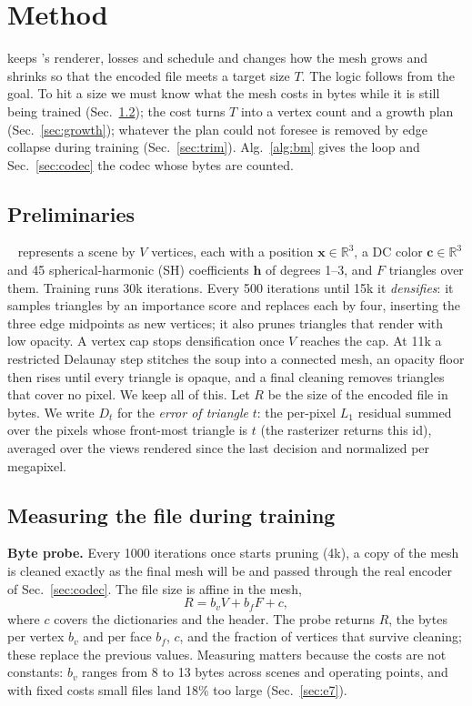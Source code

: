 \section{Method}
\label{sec:method}

\BM keeps \MS's renderer, losses and schedule and changes how the mesh grows and shrinks so that the encoded file meets a target size $T$. The logic follows from the goal. To hit a size we must know what the mesh costs in bytes while it is still being trained (Sec.~\ref{sec:probe}); the cost turns $T$ into a vertex count and a growth plan (Sec.~\ref{sec:growth}); whatever the plan could not foresee is removed by edge collapse during training (Sec.~\ref{sec:trim}). Alg.~\ref{alg:bm} gives the loop and Sec.~\ref{sec:codec} the codec whose bytes are counted.

\subsection{Preliminaries}
\label{sec:prelim}
\MS~\cite{meshsplatting2025} represents a scene by $V$ vertices, each with a position $\mathbf{x}\in\mathbb{R}^3$, a DC color $\mathbf{c}\in\mathbb{R}^3$ and 45 spherical-harmonic (SH) coefficients $\mathbf{h}$ of degrees 1--3, and $F$ triangles over them. Training runs 30k iterations. Every 500 iterations until 15k it \emph{densifies}: it samples triangles by an importance score and replaces each by four, inserting the three edge midpoints as new vertices; it also prunes triangles that render with low opacity. A vertex cap stops densification once $V$ reaches the cap. At 11k a restricted Delaunay step stitches the soup into a connected mesh, an opacity floor then rises until every triangle is opaque, and a final cleaning removes triangles that cover no pixel. We keep all of this. Let $R$ be the size of the encoded file in bytes. We write $D_t$ for the \emph{error of triangle} $t$: the per-pixel $L_1$ residual summed over the pixels whose front-most triangle is $t$ (the rasterizer returns this id), averaged over the views rendered since the last decision and normalized per megapixel.

\subsection{Measuring the file during training}
\label{sec:probe}
\noindent\textbf{Byte probe.} Every 1000 iterations once \MS starts pruning (4k), a copy of the mesh is cleaned exactly as the final mesh will be and passed through the real encoder of Sec.~\ref{sec:codec}. The file size is affine in the mesh,
\begin{equation}
R = b_v V + b_f F + c ,
\label{eq:bytes}
\end{equation}
where $c$ covers the dictionaries and the header. The probe returns $R$, the bytes per vertex $b_v$ and per face $b_f$, $c$, and the fraction of vertices that survive cleaning; these replace the previous values. Measuring matters because the costs are not constants: $b_v$ ranges from 8 to 13 bytes across scenes and operating points, and with fixed costs small files land 18\% too large (Sec.~\ref{sec:e7}).

